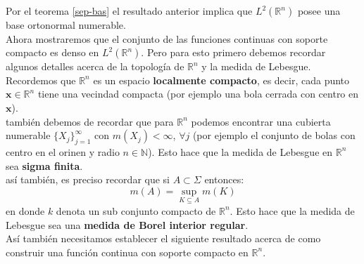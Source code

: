 \documentclass[12pt]{book}
\numberwithin{equation}{chapter}
\def\R{\mathbb{R}}
\def\x{\mathbf{x}}
\begin{document}
Por el teorema \ref{sep-bas} el resultado anterior implica que $L^{2}(\R^{n})$ posee una base ortonormal numerable.\\
Ahora mostraremos que el conjunto de las funciones continuas con soporte compacto es denso en $L^{2}(\R^{n})$. Pero para esto primero debemos recordar algunos detalles acerca de la topolog\'ia de $\R^{n}$ y la medida de Lebesgue.\\

Recordemos que $\R^{n}$ es un espacio {\bf localmente compacto}, es decir, cada punto $\x \in \R^{n}$ tiene una vecindad compacta (por ejemplo una bola cerrada con centro en $\x$). \\

tambi\'en debemos de recordar que para $\R^{n}$ podemos encontrar una cubierta numerable $\{ X_{j} \}_{j=1}^{\infty}$ con $ m(X_{j})< \infty $, $\forall j$ (por ejemplo el conjunto de bolas con centro en el orinen y radio $n \in \mathbb{N}$). Esto hace que la medida de Lebesgue en $\R^{n}$ sea {\bf sigma finita}.\\

as\'i tambi\'en, es preciso recordar que si $A \subset \Sigma$ entonces:
$$ m(A)= \sup_{K \subseteq A} m(K) $$
en donde $k$ denota un sub conjunto compacto de $\R^{n}$. Esto hace que la medida de Lebesgue sea una {\bf medida de Borel interior regular}. \\

As\'i tambi\'en necesitamos establecer el siguiente resultado acerca de como construir una funci\'on continua con soporte compacto en $\R^{n}$.
\end{document}
